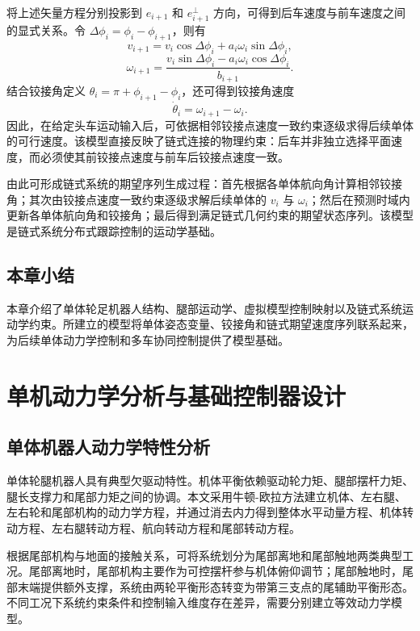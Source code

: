 \documentclass[type=bachelor]{bithesis}
\begin{document}
将上述矢量方程分别投影到 $e_{i+1}$ 和 $e_{i+1}^{\perp}$ 方向，可得到后车速度与前车速度之间的显式关系。令 $\Delta\phi_i=\phi_i-\phi_{i+1}$，则有
\begin{equation}
  v_{i+1}
  =
  v_i\cos\Delta\phi_i+a_i\omega_i\sin\Delta\phi_i ,
\end{equation}
\begin{equation}
  \omega_{i+1}
  =
  \frac{v_i\sin\Delta\phi_i-a_i\omega_i\cos\Delta\phi_i}
  {b_{i+1}} .
\end{equation}
结合铰接角定义 $\theta_i=\pi+\phi_{i+1}-\phi_i$，还可得到铰接角速度
\begin{equation}
  \dot{\theta}_i=\omega_{i+1}-\omega_i .
\end{equation}
因此，在给定头车运动输入后，可依据相邻铰接点速度一致约束逐级求得后续单体的可行速度。该模型直接反映了链式连接的物理约束：后车并非独立选择平面速度，而必须使其前铰接点速度与前车后铰接点速度一致。

由此可形成链式系统的期望序列生成过程：首先根据各单体航向角计算相邻铰接角；其次由铰接点速度一致约束逐级求解后续单体的 $v_i$ 与 $\omega_i$；然后在预测时域内更新各单体航向角和铰接角；最后得到满足链式几何约束的期望状态序列。该模型是链式系统分布式跟踪控制的运动学基础。



\section{本章小结}
本章介绍了单体轮足机器人结构、腿部运动学、虚拟模型控制映射以及链式系统运动学约束。所建立的模型将单体姿态变量、铰接角和链式期望速度序列联系起来，为后续单体动力学控制和多车协同控制提供了模型基础。

\chapter{单机动力学分析与基础控制器设计}

\section{单体机器人动力学特性分析}
单体轮腿机器人具有典型欠驱动特性。机体平衡依赖驱动轮力矩、腿部摆杆力矩、腿长支撑力和尾部力矩之间的协调。本文采用牛顿-欧拉方法建立机体、左右腿、左右轮和尾部机构的动力学方程，并通过消去内力得到整体水平动量方程、机体转动方程、左右腿转动方程、航向转动方程和尾部转动方程。

根据尾部机构与地面的接触关系，可将系统划分为尾部离地和尾部触地两类典型工况。尾部离地时，尾部机构主要作为可控摆杆参与机体俯仰调节；尾部触地时，尾部末端提供额外支撑，系统由两轮平衡形态转变为带第三支点的尾辅助平衡形态。不同工况下系统约束条件和控制输入维度存在差异，需要分别建立等效动力学模型。
\end{document}
